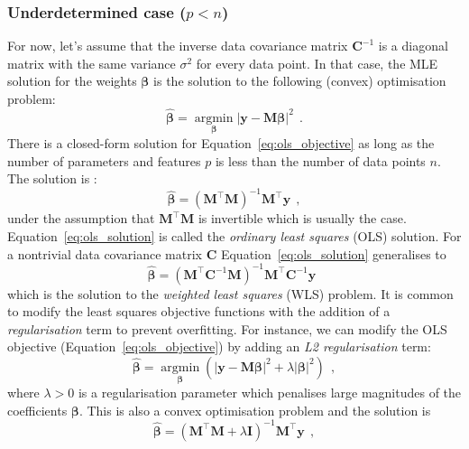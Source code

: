 \documentclass[12pt,dvipsnames]{report}
\renewcommand{\vec}[1]{\boldsymbol{\mathbf{#1}}}
\newcommand{\hquad}{~~}
\begin{document}
\subsubsection{Underdetermined case ($p < n$)}
For now, let's assume that the inverse data covariance matrix $\vec{C}^{-1}$ is
a diagonal matrix with the same variance $\sigma^2$ for every data point.
In that case, the MLE solution for the weights $\vec{\beta}$ is the solution to the
following (convex) optimisation problem:
\begin{equation}
    \hat{\vec\beta}=
    \underset{\vec \beta}{\operatorname{argmin}}\left|\vec{y}-\vec{M} \vec\beta\right|^{2}
    \hquad.
    \label{eq:ols_objective}
\end{equation}
There is a closed-form solution for Equation~\ref{eq:ols_objective} as long as the number
of parameters and features $p$ is less than the number of data points $n$. The solution
is \citep{arXiv:2101.07256}:
\begin{equation}
    \hat{\vec\beta}=(\vec{M}^{\intercal} \vec{M})^{-1} \vec{M}^{\intercal} \vec{y}
    \hquad,
    \label{eq:ols_solution}
\end{equation}
under the assumption that $\vec{M}^\intercal\vec{M}$ is invertible which is usually the case.
Equation~\ref{eq:ols_solution} is called the \emph{ordinary least squares} (OLS) solution.
For a nontrivial data covariance matrix $\vec{C}$ Equation~\ref{eq:ols_solution} generalises
to
\begin{equation}
    \hat{\vec\beta}=(\vec{M}^{\intercal}\vec{C}^{-1}\vec{M})^{-1} \vec{M}^{\intercal}\vec{C}^{-1} \vec{y}
    \hquad
    \label{eq:wls_solution}
\end{equation}
which is the solution to the \emph{weighted least squares} (WLS) problem.
It is common to modify the least squares objective functions with the addition of a
\emph{regularisation} term to prevent overfitting. For instance, we can modify the OLS
objective (Equation~\ref{eq:ols_objective}) by adding an \emph{L2 regularisation} term:
\begin{equation}
    \hat{\vec\beta}=
    \underset{\vec \beta}{\operatorname{argmin}}\left(\left|\vec{y}-\vec{M} \vec\beta\right|^{2} + \lambda \left|\vec\beta\right|^2 \right)
    \hquad,
    \label{eq:ols_objective_l2}
\end{equation}
where $\lambda >0$ is a regularisation parameter
which penalises large magnitudes of the coefficients $\vec\beta$. This is also a convex
optimisation problem and the solution is
\begin{equation}
    \hat{\vec\beta}=(\vec{M}^{\intercal} \vec{M} + \lambda\vec{I})^{-1} \vec{M}^{\intercal} \vec{y}
    \hquad,
    \label{eq:ols_solution_l2}
\end{equation}
\end{document}
